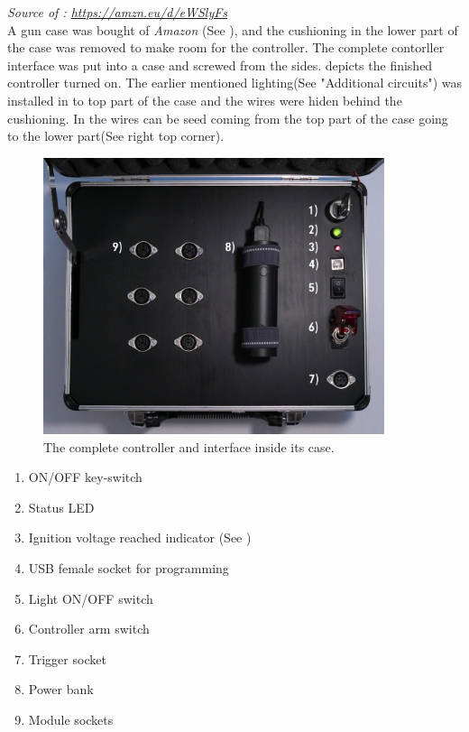 \noindent \textit{\small{Source of : \url{https://amzn.eu/d/eWSlyFs}}}\\

\noindent A gun case was bought of \textit{Amazon} (See ), and the cushioning in the lower part of the case was removed to make room for the controller. The complete contorller interface was put into a case and screwed from the sides.  depicts the finished controller turned on. The earlier mentioned lighting(See  "Additional circuits") was installed in to top part of the case and the wires were hiden behind the cushioning. In  the wires can be seed coming from the top part of the case going to the lower part(See  right top corner).


\begin{figure}[!ht]
    \centering
    \includegraphics[width=10cm]{./Figures/controller_open_legend.png}
    \caption{ The complete controller and interface inside its case. }
    \label{fig:controller_open}     
\end{figure}

\begin{enumerate}
	\item ON/OFF key-switch
	\item Status LED 
	\item Ignition voltage reached indicator (See )
	\item USB female socket for programming
	\item Light ON/OFF switch
	\item Controller arm switch
	\item Trigger socket
	\item Power bank
	\item Module sockets
\end{enumerate}

